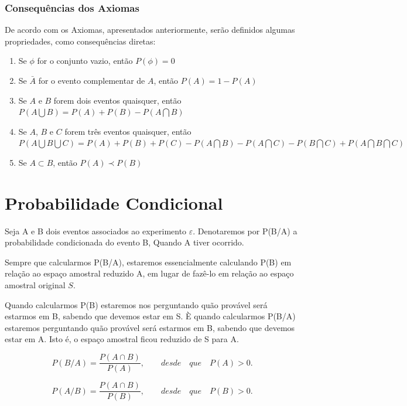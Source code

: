 \subsubsection{Consequências dos Axiomas}

\inic De acordo com os Axiomas, apresentados anteriormente, serão definidos algumas propriedades, como consequências diretas:

\begin{enumerate}
\item Se $\phi$ for o conjunto vazio, então $P(\phi)=0$
\item Se $\bar{A}$ for o evento complementar de $A$, então $P(A)=1-P(A)$
\item Se $A$ e $B$ forem dois eventos quaisquer, então $P(A \bigcup B)= P(A)+P(B)-P(A \bigcap B)$ 
\item Se $A$, $B$ e $C$ forem três eventos quaisquer, então $P(A \bigcup B \bigcup C)= P(A)+P(B)+P(C)- P(A \bigcap B)- P(A \bigcap C)- P(B \bigcap C)+P(A \bigcap B \bigcap C)$
\item Se $A \subset B$, então $P(A) \prec P(B)$
\end{enumerate}



\section{Probabilidade Condicional}

Seja A e B dois eventos associados ao experimento $\varepsilon$.
Denotaremos por P(B/A) a probabilidade condicionada do evento B,
Quando A tiver ocorrido.\vskip0.3cm

Sempre que calcularmos P(B/A), estaremos essencialmente calculando
P(B) em relação ao espaço amostral reduzido A, em lugar de fazê-lo
em relação ao espaço amostral original $S$.\vskip0.3cm

Quando calcularmos P(B) estaremos nos perguntando quão provável
será estarmos em B, sabendo que devemos estar em S. È quando
calcularmos P(B/A) estaremos perguntando quão provável será
estarmos em B, sabendo que devemos estar em A. Isto é, o espaço
amostral ficou reduzido de S para A.



\begin{equation}\label{}
    P(B/A) = \frac{P(A \cap B)}{P(A)}, \quad \quad desde \quad que
    \quad P(A)>0.
\end{equation}

\begin{equation}\label{}
    P(A/B) = \frac{P(A \cap B)}{P(B)}, \quad \quad desde \quad que
    \quad P(B)>0.
\end{equation}

